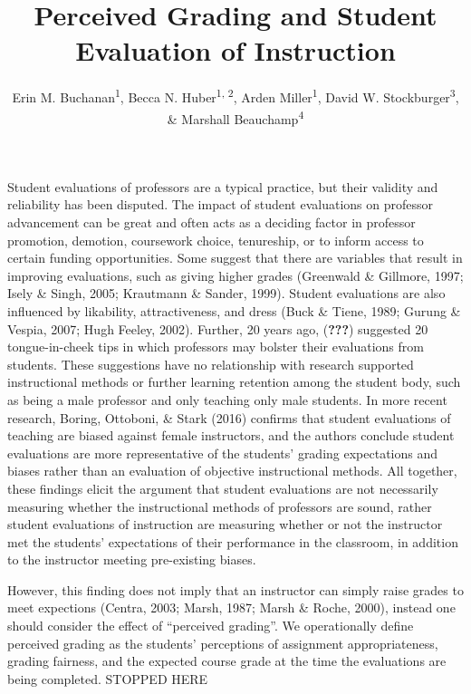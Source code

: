 \documentclass[man]{apa6}
\title{Perceived Grading and Student Evaluation of Instruction}
\author{Erin M. Buchanan\textsuperscript{1}, Becca N. Huber\textsuperscript{1, 2}, Arden Miller\textsuperscript{1}, David W. Stockburger\textsuperscript{3}, \& Marshall Beauchamp\textsuperscript{4}}
\affiliation{
    \vspace{0.5cm}
          \textsuperscript{1} Missouri State University\\
          \textsuperscript{2} Idaho State University\\
          \textsuperscript{3} US Air Force Academy\\
          \textsuperscript{4} University of Missouri - Kansas City  }
\newcounter{author}
\theoremstyle{definition}
\theoremstyle{definition}
\theoremstyle{definition}
\theoremstyle{remark}
\begin{document}
\maketitle

\setcounter{secnumdepth}{0}



Student evaluations of professors are a typical practice, but their
validity and reliability has been disputed. The impact of student
evaluations on professor advancement can be great and often acts as a
deciding factor in professor promotion, demotion, coursework choice,
tenureship, or to inform access to certain funding opportunities. Some
suggest that there are variables that result in improving evaluations,
such as giving higher grades (Greenwald \& Gillmore, 1997; Isely \&
Singh, 2005; Krautmann \& Sander, 1999). Student evaluations are also
influenced by likability, attractiveness, and dress (Buck \& Tiene,
1989; Gurung \& Vespia, 2007; Hugh Feeley, 2002). Further, 20 years ago,
({\textbf{???}}) suggested 20 tongue-in-cheek tips in which professors
may bolster their evaluations from students. These suggestions have no
relationship with research supported instructional methods or further
learning retention among the student body, such as being a male
professor and only teaching only male students. In more recent research,
Boring, Ottoboni, \& Stark (2016) confirms that student evaluations of
teaching are biased against female instructors, and the authors conclude
student evaluations are more representative of the students' grading
expectations and biases rather than an evaluation of objective
instructional methods. All together, these findings elicit the argument
that student evaluations are not necessarily measuring whether the
instructional methods of professors are sound, rather student
evaluations of instruction are measuring whether or not the instructor
met the students' expectations of their performance in the classroom, in
addition to the instructor meeting pre-existing biases.

However, this finding does not imply that an instructor can simply raise
grades to meet expections (Centra, 2003; Marsh, 1987; Marsh \& Roche,
2000), instead one should consider the effect of \enquote{perceived
grading}. We operationally define perceived grading as the students'
perceptions of assignment appropriateness, grading fairness, and the
expected course grade at the time the evaluations are being completed.
STOPPED HERE
\end{document}
